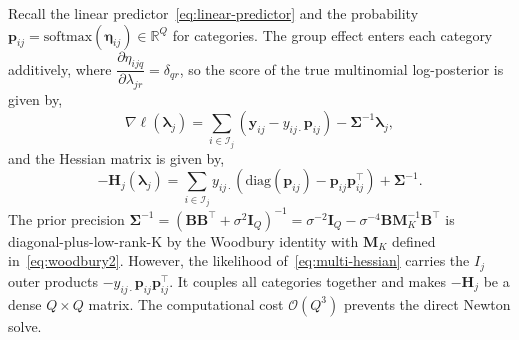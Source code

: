 Recall the linear predictor~\eqref{eq:linear-predictor} and the probability $\bm{p}_{ij}=\text{softmax}(\bm{\eta}_{ij})\in\mathbb{R}^{Q}$ for categories. The group effect enters each category additively, where $\dfrac{\partial\eta_{ijq}}{\partial \lambda_{jr}}=\delta_{qr}$, so the score of the true multinomial log-posterior is given by,
\begin{equation}
    \nabla\ell(\bm{\lambda}_{j})=\sum_{i\in\mathcal{I}_{j}}(\bm{y}_{ij}-y_{ij\cdot}\bm{p}_{ij})-\bm{\Sigma}^{-1}\bm{\lambda}_{j},
    \label{eq:true-multi-log-post}
\end{equation}
and the Hessian matrix is given by,
\begin{equation}
    -\mathbf{H}_{j}(\bm{\lambda}_{j})=\sum_{i\in\mathcal{I}_{j}}y_{ij\cdot}\left(\text{diag}(\bm{p}_{ij})-\bm{p}_{ij}\bm{p}_{ij}^{\top}\right)+\bm{\Sigma}^{-1}.
    \label{eq:multi-hessian}
\end{equation}
The prior precision $\bm{\Sigma}^{-1}=\left(\mathbf{BB}^{\top}+\sigma^{2}\mathbf{I}_{Q}\right)^{-1}=\sigma^{-2}\mathbf{I}_{Q}-\sigma^{-4}\mathbf{BM}_{K}^{-1}\mathbf{B}^{\top}$ is diagonal-plus-low-rank-K by the Woodbury identity with $\mathbf{M}_{K}$ defined in~\eqref{eq:woodbury2}. However, the likelihood of~\eqref{eq:multi-hessian} carries the $I_{j}$ outer products $-y_{ij\cdot}\bm{p}_{ij}\bm{p}_{ij}^{\top}$. It couples all categories together and makes $-\mathbf{H}_{j}$ be a dense $Q\times Q$ matrix. The computational cost $\mathcal{O}(Q^{3})$ prevents the direct Newton solve.

